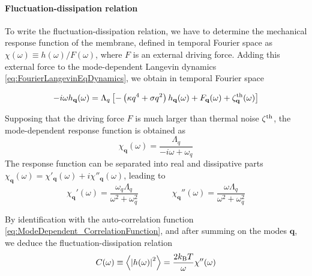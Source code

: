 \documentclass[graybox]{svmult}
\begin{document}
			\paragraph{\textbf{Fluctuation-dissipation relation}}
			\label{sec:FluctuationDissipation}
To write the fluctuation-dissipation relation, we have to determine the mechanical response function of the membrane, defined in temporal Fourier space as $\chi(\omega) \equiv h(\omega)/F(\omega)$, where $F$ is an external driving force. Adding this external force to the mode-dependent Langevin dynamics \eqref{eq:FourierLangevinEqDynamics}, we obtain in temporal Fourier space

\begin{equation}
-i\omega h_{\mathbf{q}}(\omega) = \Lambda_{q}\left[ - \left(\kappa q^4 +\sigma q^2 \right)h_{\mathbf{q}}(\omega) + F_{\mathbf{q}}(\omega) + \zeta^{\rm{th}}_{\mathbf{q}}(\omega)\right]
\end{equation}

Supposing that the driving force $F$ is much larger than thermal noise $\zeta^{\rm{th}}$, the mode-dependent response function is obtained as
\begin{equation}
\chi_{\mathbf{q}}(\omega) = \frac{\Lambda_{q}}{-i\omega + \omega_q}
\end{equation}
The response function can be separated into real and dissipative parts $\chi_{\mathbf{q}}(\omega) = \chi'_{\mathbf{q}}(\omega) + i\chi''_{\mathbf{q}}(\omega)$, leading to
\begin{equation}
\chi_{\mathbf{q}}'(\omega) = \frac{\omega_q\Lambda_{q}}{\omega^2 + \omega_{q}^2} \qquad\qquad
\chi_{\mathbf{q}}''(\omega) = \frac{\omega\Lambda_{q} }{\omega^2 + \omega_{q}^2}
\end{equation}

By identification with the auto-correlation function \eqref{eq:ModeDependent_CorrelationFunction}, and after summing on the modes $\mathbf{q}$, we deduce the fluctuation-dissipation relation
\begin{equation}
\label{eq:FluctuationDissipationRelation}
C(\omega) \equiv \left\langle \left| h(\omega)\right| ^2 \right\rangle = \frac{2k_{\rm{B}}T}{\omega}\chi''(\omega)
\end{equation}
\end{document}

